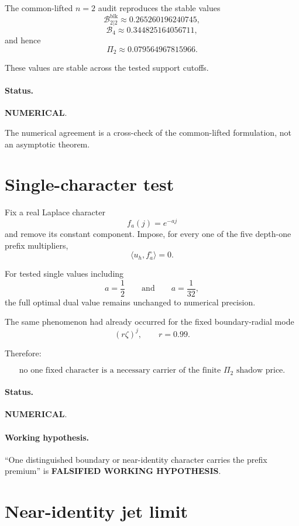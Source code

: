 \documentclass[11pt,a4paper]{article}
\newcommand{\Bcal}{\mathcal B}
\newcommand{\blk}{\mathrm{blk}}
\newcommand{\NUM}{\textcolor{blue!70!black}{\textbf{NUMERICAL}}}
\newcommand{\FALSIFIED}{\textcolor{purple!75!black}{\textbf{FALSIFIED WORKING HYPOTHESIS}}}
\begin{document}
The common-lifted \(n=2\) audit reproduces the stable values
\[
\boxed{
\Bcal^{\blk}_{2|2}
\approx
0.265260196240745,
}
\tag{28}
\]
\[
\boxed{
\Bcal_4
\approx
0.344825164056711,
}
\tag{29}
\]
and hence
\[
\boxed{
\Pi_2
\approx
0.079564967815966.
}
\tag{30}
\]

These values are stable across the tested support cutoffs.

\paragraph{Status.}
\NUM.

The numerical agreement is a cross-check of the common-lifted formulation,
not an asymptotic theorem.

\section{Single-character test}

Fix a real Laplace character
\[
f_a(j)=e^{-aj}
\]
and remove its constant component.
Impose, for every one of the five depth-one prefix multipliers,
\[
\langle u_h,f_a^\circ\rangle=0.
\]

For tested single values including
\[
a=\frac12
\qquad\text{and}\qquad
a=\frac1{32},
\]
the full optimal dual value remains unchanged to numerical precision.

The same phenomenon had already occurred for the fixed boundary-radial mode
\[
(r\zeta)^j,
\qquad
r=0.99.
\]

Therefore:

\[
\boxed{
\text{no one fixed character is a necessary carrier of the finite }\Pi_2
\text{ shadow price.}
}
\tag{31}
\]

\paragraph{Status.}
\NUM.

\paragraph{Working hypothesis.}
``One distinguished boundary or near-identity character carries the
prefix premium'' is \FALSIFIED.

\section{Near-identity jet limit}
\end{document}
